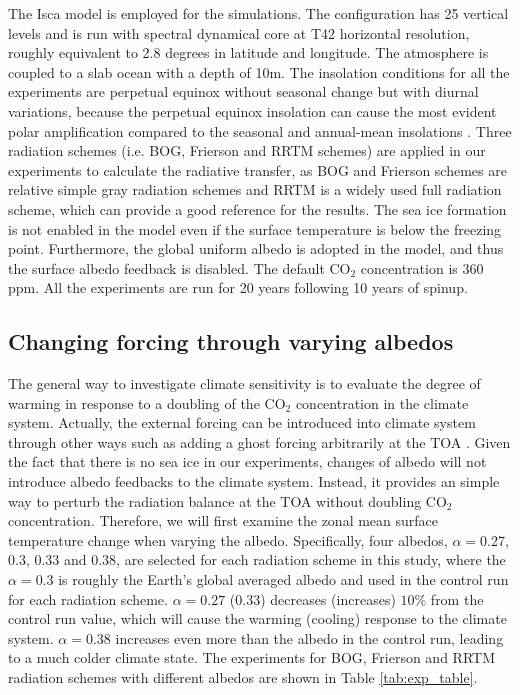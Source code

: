 The Isca model is employed for the simulations. The configuration has 25 vertical levels and is run with spectral dynamical core at T42 horizontal resolution, roughly equivalent to 2.8 degrees in latitude and longitude. The atmosphere is coupled to a slab ocean with a depth of 10m. The insolation conditions for all the experiments are perpetual equinox without seasonal change but with diurnal variations, because the perpetual equinox insolation can cause the most evident polar amplification compared to the seasonal and annual-mean insolations \citep{Kim2018}. Three radiation schemes (i.e. BOG, Frierson and RRTM schemes) are applied in our experiments to calculate the radiative transfer, as BOG and Frierson schemes are relative simple gray radiation schemes and RRTM is a widely used full radiation scheme, which can provide a good reference for the results. The sea ice formation is not enabled in the model even if the surface temperature is below the freezing point. Furthermore, the global uniform albedo is adopted in the model, and thus the surface albedo feedback is disabled. The default CO$_2$ concentration is 360 ppm. All the experiments are run for 20 years following 10 years of spinup.



\subsection{Changing forcing through varying albedos}
The general way to investigate climate sensitivity is to evaluate the degree of warming in response to a doubling of the CO$_2$ concentration in the climate system. Actually, the external forcing can be introduced into climate system through other ways such as adding a ghost forcing  arbitrarily at the TOA \citep{Hansen1997,Alexeev2005}. Given the fact that there is no sea ice in our experiments, changes of albedo will not introduce albedo feedbacks to the climate system. Instead, it provides an simple way to perturb the radiation balance at the TOA without doubling CO$_2$ concentration. Therefore, we will first examine the zonal mean surface temperature change when varying the albedo. Specifically, four albedos, $\alpha=$0.27, 0.3, 0.33 and 0.38, are selected for each radiation scheme in this study, where the $\alpha = 0.3$ is roughly the Earth's global averaged albedo and used in the control run for each radiation scheme. $\alpha=0.27$ (0.33) decreases (increases) $10\%$ from the control run value, which will cause the warming (cooling) response to the climate system. $\alpha=0.38$ increases even more than the albedo in the control run, leading to a much colder climate state. The experiments for BOG, Frierson and RRTM radiation schemes with different albedos are shown in Table \ref{tab:exp_table}.

